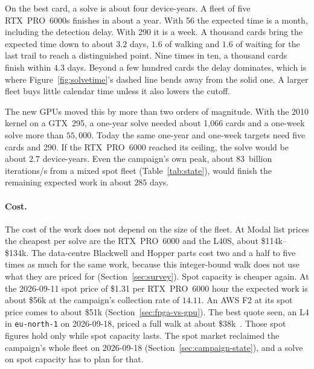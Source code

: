 

On the best card, a solve is about four device-years. A fleet of five
RTX~PRO~6000s finishes in about a year. With 56 the expected time is a
month, including the detection delay. With 290 it is a week. A thousand
cards bring the expected time down to about $3.2$ days, $1.6$ of
walking and $1.6$ of waiting for the last trail to reach a
distinguished point. Nine times in ten, a thousand cards finish within
$4.3$ days. Beyond a few hundred cards the delay dominates, which is
where Figure~\ref{fig:solvetime}'s dashed line bends away from the
solid one. A larger fleet buys little calendar time unless it also
lowers the cutoff.

The new GPUs moved this by more than two orders of magnitude. With the
2010 kernel on a GTX~295, a one-year solve needed about 1{,}066 cards
and a one-week solve more than $55{,}000$. Today the same one-year and
one-week targets need five cards and 290. If the RTX~PRO~6000 reached
its ceiling, the solve would be about $2.7$ device-years. Even the
campaign's own peak, about $83$~billion iterations/s from a mixed spot
fleet (Table~\ref{tab:state}), would finish the remaining expected
work in about $285$ days.

\paragraph{Cost.} The cost of the work does not depend on the size of
the fleet. At Modal list prices the cheapest per solve are the
RTX~PRO~6000 and the L40S, about \$114k--\$134k. The data-centre
Blackwell and Hopper parts cost two and a half to five times as much
for the same work, because this integer-bound walk does not use what
they are priced for (Section~\ref{sec:survey}). Spot capacity is
cheaper again. At the 2026-09-11 spot price of \$1.31 per RTX~PRO~6000
hour the expected work is about \$56k at the campaign's collection rate
of $14.11$. An AWS F2 at its spot price comes to about \$51k
(Section~\ref{sec:fpga-vs-gpu}). The best quote seen, an L4 in
\texttt{eu-north-1} on 2026-09-18, priced a full walk at about
\$38k~. Those spot figures hold only
while spot capacity lasts. The spot market reclaimed the campaign's
whole fleet on 2026-09-18 (Section~\ref{sec:campaign-state}), and a
solve on spot capacity has to plan for that.

